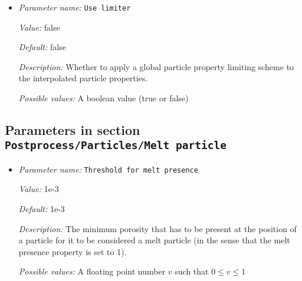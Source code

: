 \begin{itemize}
{\it Default:} -1.7976931348623157e+308


{\it Description:} The minimum global particle property that will be used as a limiter for the bilinear least squares interpolation. The number of the input 'Global particle property minimum' values separated by ',' has to be the same as the number of particle properties.


{\it Possible values:} A list of 0 to 4294967295 elements where each element is [A floating point number $v$ such that $-\text{MAX\_DOUBLE} \leq v \leq \text{MAX\_DOUBLE}$]
\item {\it Parameter name:} {\tt Use limiter}
\label{parameters:Postprocess/Particles/Interpolator/Bilinear least squares/Use limiter}
\label{parameters:Postprocess/Particles/Interpolator/Bilinear_20least_20squares/Use_20limiter}


{\it Value:} false


{\it Default:} false


{\it Description:} Whether to apply a global particle property limiting scheme to the interpolated particle properties.


{\it Possible values:} A boolean value (true or false)
\end{itemize}

\subsection{Parameters in section \tt Postprocess/Particles/Melt particle}
\label{parameters:Postprocess/Particles/Melt_20particle}

\begin{itemize}
\item {\it Parameter name:} {\tt Threshold for melt presence}
\label{parameters:Postprocess/Particles/Melt particle/Threshold for melt presence}
\label{parameters:Postprocess/Particles/Melt_20particle/Threshold_20for_20melt_20presence}


{\it Value:} 1e-3


{\it Default:} 1e-3


{\it Description:} The minimum porosity that has to be present at the position of a particle for it to be considered a melt particle (in the sense that the melt presence property is set to 1).


{\it Possible values:} A floating point number $v$ such that $0 \leq v \leq 1$
\end{itemize}

